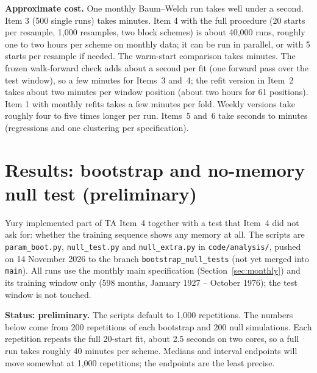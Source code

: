 \documentclass[11pt]{article}
\begin{document}
\textbf{Approximate cost.} One monthly Baum--Welch run takes well under a second. Item 3 (500 single runs) takes minutes. Item 4 with the full procedure (20 starts per resample, 1{,}000 resamples, two block schemes) is about 40{,}000 runs, roughly one to two hours per scheme on monthly data; it can be run in parallel, or with 5 starts per resample if needed. The warm-start comparison takes minutes. The frozen walk-forward check adds about a second per fit (one forward pass over the test window), so a few minutes for Items~3 and~4; the refit version in Item~2 takes about two minutes per window position (about two hours for 61 positions). Item 1 with monthly refits takes a few minutes per fold. Weekly versions take roughly four to five times longer per run. Items~5 and~6 take seconds to minutes (regressions and one clustering per specification).

\section{Results: bootstrap and no-memory null test (preliminary)}\label{sec:bootnull}

Yury implemented part of TA Item~4 together with a test that Item~4 did not ask for: whether the training sequence shows any memory at all. The scripts are \texttt{param\_boot.py}, \texttt{null\_test.py} and \texttt{null\_extra.py} in \texttt{code/analysis/}, pushed on 14 November 2026 to the branch \texttt{bootstrap\_null\_tests} (not yet merged into \texttt{main}). All runs use the monthly main specification (Section~\ref{sec:monthly}) and its training window only (598 months, January 1927 -- October 1976); the test window is not touched.

\textbf{Status: preliminary.} The scripts default to 1{,}000 repetitions. The numbers below come from 200 repetitions of each bootstrap and 200 null simulations. Each repetition repeats the full 20-start fit, about 2.5 seconds on two cores, so a full run takes roughly 40 minutes per scheme. Medians and interval endpoints will move somewhat at 1{,}000 repetitions; the endpoints are the least precise.
\end{document}
